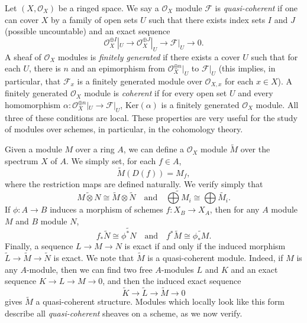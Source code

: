 Let $(X,\mathcal{O}_X)$ be a ringed space. We say a $\mathcal{O}_X$ module $\mathcal{F}$ is \emph{quasi-coherent} if one can cover $X$ by a family of open sets $U$ such that there exists index sets $I$ and $J$ (possible uncountable) and an exact sequence
%
\[ \mathcal{O}_X^{\oplus I}|_U \to \mathcal{O}_X^{\oplus J}|_U \to \mathcal{F}|_U \to 0. \]
%
A sheaf of $\mathcal{O}_X$ modules is \emph{finitely generated} if there exists a cover $U$ such that for each $U$, there is $n$ and an epimorphism from $\mathcal{O}_X^{\oplus n}|_U$ to $\mathcal{F}|_U$ (this implies, in particular, that $\mathcal{F}_x$ is a finitely generated module over $\mathcal{O}_{X,x}$ for each $x \in X$). A finitely generated $\mathcal{O}_X$ module is \emph{coherent} if for every open set $U$ and every homomorphism $\alpha: \mathcal{O}_X^{\oplus n}|_U \to \mathcal{F}|_U$, $\text{Ker}(\alpha)$ is a finitely generated $\mathcal{O}_X$ module. All three of these conditions are local. These properties are very useful for the study of modules over schemes, in particular, in the cohomology theory.

Given a module $M$ over a ring $A$, we can define a $\mathcal{O}_X$ module $\widetilde{M}$ over the spectrum $X$ of $A$. We simply set, for each $f \in A$,
%
\[ \widetilde{M}(D(f)) = M_f, \]
%
where the restriction maps are defined naturally. We verify simply that
%
\[ \widetilde{M \otimes N} \cong \widetilde{M} \otimes \widetilde{N} \quad\text{and}\quad \widetilde{\bigoplus M_i} \cong \bigoplus \widetilde{M_i}. \]
%
If $\phi: A \to B$ induces a morphism of schemes $f: X_B \to X_A$, then for any $A$ module $M$ and $B$ module $N$,
%
\[ f_* \widetilde{N} \cong \widetilde{\phi^* N} \quad\text{and}\quad f^* \widetilde{M} \cong \widetilde{\phi_* M}. \]
%
Finally, a sequence $L \to M \to N$ is exact if and only if the induced morphism $\widetilde{L} \to \widetilde{M} \to \widetilde{N}$ is exact. We note that $\widetilde{M}$ is a quasi-coherent module. Indeed, if $M$ is any $A$-module, then we can find two free $A$-modules $L$ and $K$ and an exact sequence $K \to L \to M \to 0$, and then the induced exact sequence
%
\[ \widetilde{K} \to \widetilde{L} \to \widetilde{M} \to 0 \]
%
gives $\widetilde{M}$ a quasi-coherent structure. Modules which locally look like this form describe all \emph{quasi-coherent} sheaves on a scheme, as we now verify.

